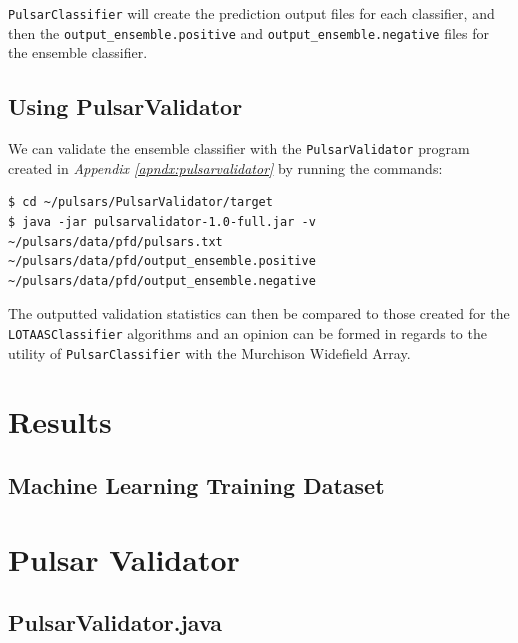 \documentclass{article}
\begin{document}
\begin{appendices}
\begin{subappendices}
\verb|PulsarClassifier| will create the prediction output files for each classifier, and then the \verb|output_ensemble.positive| and \verb|output_ensemble.negative| files for the ensemble classifier. 

\subsection{Using PulsarValidator}
\label{apndx:usepulsarvalidator}
We can validate the ensemble classifier with the \verb|PulsarValidator| program created in \emph{Appendix \ref{apndx:pulsarvalidator}} by running the commands:

\begin{lstlisting}[numbers=none]
$ cd ~/pulsars/PulsarValidator/target
$ java -jar pulsarvalidator-1.0-full.jar -v ~/pulsars/data/pfd/pulsars.txt ~/pulsars/data/pfd/output_ensemble.positive ~/pulsars/data/pfd/output_ensemble.negative
\end{lstlisting}

The outputted validation statistics can then be compared to those created for the \verb|LOTAASClassifier| algorithms and an opinion can be formed in regards to the utility of \verb|PulsarClassifier| with the Murchison Widefield Array.

    \end{subappendices}

    \section{Results}
    \subsection{Machine Learning Training Dataset}
    \label{sec:training}
    

    \pagebreak
    \section{Pulsar Validator}
    \begin{subappendices}
        \label{src:pulsarvalidator} 
        \subsection{PulsarValidator.java}
        \label{src:pulsarvalidator:entry}
        


\end{subappendices}
\end{appendices}
\end{document}
